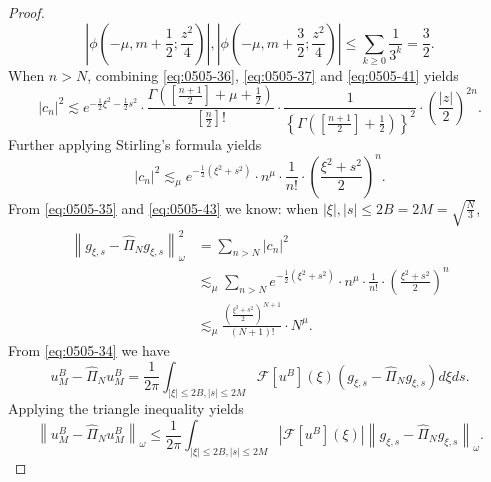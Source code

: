 \documentclass[10pt,a4paper]{amsart}
\begin{document}
\begin{proof}
\begin{equation}
    \left|\phi\left(-\mu, m+\frac{1}{2} ; \frac{z^2}{4}\right)\right|,\left|\phi\left(-\mu, m+\frac{3}{2} ; \frac{z^2}{4}\right)\right| \leqslant \sum_{k\geqslant 0} \frac{1}{3^k} = \frac{3}{2}.
  \end{equation}
  When $n>N$, combining \eqref{eq:0505-36}, \eqref{eq:0505-37} and
  \eqref{eq:0505-41} yields
  \begin{equation}\label{eq:0505-42}
    \left|c_n\right|^2 \lesssim e^{-\frac{1}{2} \xi^2-\frac{1}{2} s^2} \cdot \frac{\Gamma\left(\left[\frac{n+1}{2}\right]+\mu+\frac{1}{2}\right)}{\left[\frac{n}{2}\right]!} \cdot \frac{1}{\left\{\Gamma\left(\left[\frac{n+1}{2}\right]+\frac{1}{2}\right)\right\}^2} \cdot \left(\frac{|z|}{2}\right)^{2 n}.
  \end{equation}
  Further applying Stirling's formula yields
  \begin{equation}\label{eq:0505-43}
    \left|c_n\right|^2 \lesssim_\mu e^{-\frac{1}{2}\left(\xi^2+s^2\right)} \cdot n^\mu \cdot \frac{1}{n!} \cdot\left(\frac{\xi^2+s^2}{2}\right)^n.
  \end{equation}
  From \eqref{eq:0505-35} and \eqref{eq:0505-43} we know: when $|\xi|,|s| \leqslant 2 B=2 M=\sqrt{\frac{N}{3}}$,
  \begin{equation}\label{eq:0505-44}
    \begin{aligned}
    \left\|g_{\xi, s}-\widehat{\Pi}_N g_{\xi, s}\right\|_\omega^2 & =\sum_{n>N}\left|c_n\right|^2 \\
    & \lesssim_\mu \sum_{n>N} e^{-\frac{1}{2}\left(\xi^2+s^2\right)} \cdot n^\mu \cdot \frac{1}{n!} \cdot\left(\frac{\xi^2+s^2}{2}\right)^n \\
    & \lesssim_\mu \frac{\left(\frac{\xi^2+s^2}{2}\right)^{N+1}}{(N+1)!} \cdot N^\mu.
    \end{aligned}
  \end{equation}
  From \eqref{eq:0505-34} we have
  \begin{equation}\label{eq:0505-45}
    u_M^B-\widehat{\Pi}_N u_M^B=\frac{1}{2 \pi} \int_{|\xi| \leqslant 2 B,|s| \leqslant 2 M} \mathcal{F}\left[u^B\right](\xi)\left(g_{\xi, s}-\widehat{\Pi}_N g_{\xi, s}\right) d \xi d s.
  \end{equation}
  Applying the triangle inequality yields
  \begin{equation}\label{eq:0505-46}
    \left\|u_M^B-\widehat{\Pi}_N u_M^B\right\|_\omega \leqslant \frac{1}{2 \pi} \int_{|\xi| \leqslant 2 B,|s| \leqslant 2 M}\left|\mathcal{F} \left[ u^B \right](\xi)\right|\left\|g_{\xi, s}-\widehat{\Pi}_N g_{\xi,s}\right\|_\omega.
  \end{equation}

\end{proof}
\end{document}
